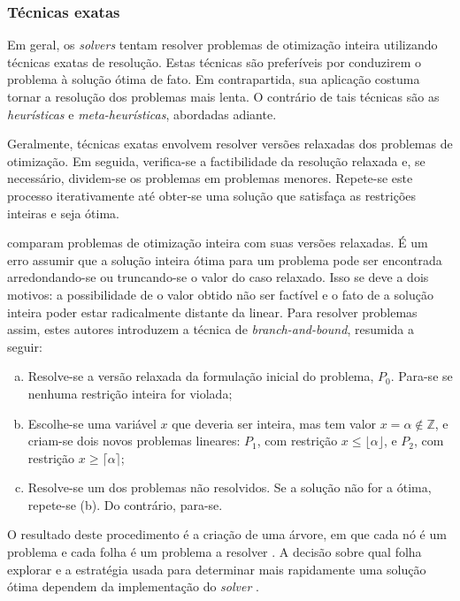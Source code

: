 \subsubsection{Técnicas exatas}
Em geral, os \emph{solvers} tentam resolver problemas de otimização inteira utilizando técnicas exatas de resolução. Estas técnicas são preferíveis por conduzirem o problema à solução ótima de fato. Em contrapartida, sua aplicação costuma tornar a resolução dos problemas mais lenta. O contrário de tais técnicas são as \emph{heurísticas} e \emph{meta-heurísticas}, abordadas adiante.

Geralmente, técnicas exatas envolvem resolver versões relaxadas dos problemas de otimização. Em seguida, verifica-se a factibilidade da resolução relaxada e, se necessário, dividem-se os problemas em problemas menores. Repete-se este processo iterativamente até obter-se uma solução que satisfaça as restrições inteiras e seja ótima.

\textcite{BRADLEY:77,MOHAMED:21} comparam problemas de otimização inteira com suas versões relaxadas. É um erro assumir que a solução inteira ótima para um problema pode ser encontrada arredondando-se ou truncando-se o valor do caso relaxado. Isso se deve a dois motivos: a possibilidade de o valor obtido não ser factível e o fato de a solução inteira poder estar radicalmente distante da linear. Para resolver problemas assim, estes autores introduzem a técnica de \emph{branch-and-bound}, resumida a seguir:

\begin{enumerate}[(a)]
    \item Resolve-se a versão relaxada da formulação inicial do problema, $P_0$. Para-se se nenhuma restrição inteira for violada;
    \item Escolhe-se uma variável $x$ que deveria ser inteira, mas tem valor $x = \alpha \notin \mathbb{Z}$, e criam-se dois novos problemas lineares: $P_1$, com restrição $x \leq \lfloor\alpha\rfloor$, e $P_2$, com restrição $x \geq \lceil\alpha\rceil$;
    \item Resolve-se um dos problemas não resolvidos. Se a solução não for a ótima, repete-se (b). Do contrário, para-se.
\end{enumerate}

O resultado deste procedimento é a criação de uma árvore, em que cada nó é um problema e cada folha é um problema a resolver \cite{GUROBI:22}. A decisão sobre qual folha explorar e a estratégia usada para determinar mais rapidamente uma solução ótima dependem da implementação do \emph{solver} \cite{CLAUSEN:99}.

